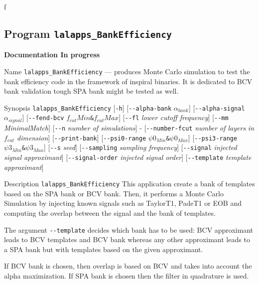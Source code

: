 f\subsection{Program \texttt{lalapps\_BankEfficiency}}
\label{program:lalapps-BankEfficiency}
{\LARGE{{\bf Documentation In progress}}}

\begin{entry}

\item[Name]
\verb$lalapps_BankEfficiency$ --- produces Monte Carlo simulation to test the bank efficiency
code in the framework of inspiral binaries. It is dedicated to BCV bank validation tough 
SPA bank might be tested as well.

\item[Synopsis]
\verb$lalapps_BankEfficiency$ [\verb$-h$] 
[\verb$--alpha-bank$   \textit{$\alpha_{bank}$}]
[\verb$--alpha-signal$ \textit{$\alpha_{signal}$}]
[\verb$--fend-bcv$     \textit{$f_{cut}Min$}\texttt{\&}\textit{$f_{cut}Max$}]
[\verb$--fl$	\textit{lower cutoff frequency}]
[\verb$--mm$ \textit{MinimalMatch}]
[\verb$--n$     \textit{number of simulations}]  - 
[\verb$--number-fcut$ \textit{number of layers } \textit{ in $f_{cut}$ dimension}]
[\verb$--print-bank$]
[\verb$--psi0-range$ \textit{$\psi0_{Min}$}\texttt{\&}\textit{$\psi0_{Max}$}]
[\verb$--psi3-range$ \textit{$\psi3_{Min}$}\texttt{\&}\textit{$\psi3_{Max}$}]
[\verb$--s$ \textit{seed}]
[\verb$--sampling$ \textit{sampling frequency}]
[\verb$--signal$ \textit{injected signal approximant}]
[\verb$--signal-order$ \textit{injected signal order}]
[\verb$--template$ \textit{template approximant}]





\item[Description]
\verb$lalapps_BankEfficiency$ This application create a bank of templates based on the
SPA bank or BCV bank. Then, it performs a Monte Carlo Simulation by injecting known signals
such as TaylorT1, PadeT1 or EOB and computing the overlap between the signal and the 
bank of templates.
 
The argument \verb$--template$  decides which bank has to be used: BCV approximant leads 
to BCV templates and BCV bank whereas any other approximant leads to a SPA bank but with 
templates based on the given approximant. 

If BCV bank is chosen, then overlap is based on BCV and takes into account the alpha
maximization. If SPA bank is chosen then the filter in quadrature is used.


\end{entry}
